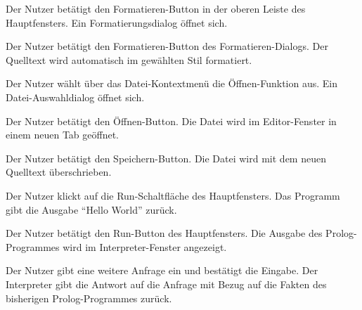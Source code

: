 \documentclass[parskip=full,11pt,twoside]{scrartcl}
\begin{document}

{Der Nutzer betätigt den Formatieren-Button in der oberen Leiste des Hauptfensters.}
{Ein Formatierungsdialog öffnet sich.}

{Der Nutzer betätigt den Formatieren-Button des Formatieren-Dialogs.}
{Der Quelltext wird automatisch im gewählten Stil formatiert.}



{Der Nutzer wählt über das Datei-Kontextmenü die Öffnen-Funktion aus.}
{Ein Datei-Auswahldialog öffnet sich.}

{Der Nutzer betätigt den Öffnen-Button.}
{Die Datei wird im Editor-Fenster in einem neuen Tab geöffnet.}

{Der Nutzer betätigt den Speichern-Button.}
{Die Datei wird mit dem neuen Quelltext überschrieben.}



{Der Nutzer klickt auf die Run-Schaltfläche des Hauptfensters.}
{Das Programm gibt die Ausgabe \enquote{Hello World} zurück.}



{Der Nutzer betätigt den Run-Button des Hauptfensters.}
{Die Ausgabe des Prolog-Programmes wird im Interpreter-Fenster angezeigt.}

{Der Nutzer gibt eine weitere Anfrage ein und bestätigt die Eingabe.}
{Der Interpreter gibt die Antwort auf die Anfrage mit Bezug auf die Fakten des bisherigen Prolog-Programmes zurück.}
\end{document}
